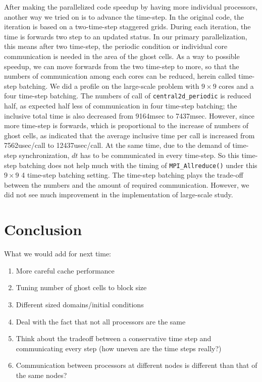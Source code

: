\documentclass{article}
\begin{document}
After making the parallelized code speedup by having more individual processors, another way we tried on is to advance the time-step. In the original code, the iteration is based on a two-time-step staggered grids. During each iteration, the time is forwards two step to an updated status. In our primary parallelization, this means after two time-step, the periodic condition or individual core communication is needed in the area of the ghost cells. As a way to possible speedup, we can move forwards from the two time-step to more, so that the numbers of communication among each cores can be reduced, herein called time-step batching. We did a profile on the large-scale problem with $9\times9$ cores and a four time-step batching. The numbers of call of \texttt{central2d\_periodic} is reduced half, as expected half less of communication in four time-step batching; the inclusive total time is also decreased from 9164msec to 7437msec. However, since more time-step is forwards, which is proportional to the increase of numbers of ghost cells, as indicated that the average inclusive time per call is increased from 7562usec/call to 12437usec/call. At the same time, due to the demand of time-step synchronization, $dt$ has to be communicated in every time-step. So this time-step batching does not help much with the timing of \texttt{MPI\_Allreduce()} under this $9\times9$ 4 time-step batching setting. The time-step batching plays the trade-off between the numbers and the amount of required communication. However, we did not see much improvement in the implementation of large-scale study.



\section{Conclusion}
What we would add for next time:
\begin{enumerate}
	\item More careful cache performance
	\item Tuning number of ghost cells to block size
	\item Different sized domains/initial conditions
	\item Deal with the fact that not all processors are the same
	\item Think about the tradeoff between a conservative time step and communicating every step (how uneven are the time steps really?)
	\item Communication between processors at different nodes is different than that of the same nodes?
\end{enumerate}
\end{document}
